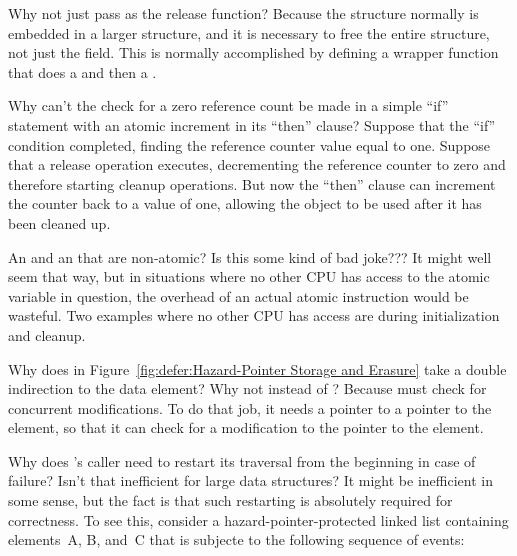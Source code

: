 \begin{enumerate}
\QuickQ{}
	Why not just pass  as the release function?
\QuickA{}
	Because the  structure normally is embedded in
	a larger structure, and it is necessary to free the entire
	structure, not just the  field.
	This is normally accomplished by defining a wrapper function
	that does a  and then a .

\QuickQ{}
	Why can't the check for a zero reference count be
	made in a simple ``if'' statement with an atomic
	increment in its ``then'' clause?
\QuickA{}
	Suppose that the ``if'' condition completed, finding
	the reference counter value equal to one.
	Suppose that a release operation executes, decrementing
	the reference counter to zero and therefore starting
	cleanup operations.
	But now the ``then'' clause can increment the counter
	back to a value of one, allowing the object to be
	used after it has been cleaned up.

\QuickQ{}
	An  and an  that are
	non-atomic?
	Is this some kind of bad joke???
\QuickA{}
	It might well seem that way, but in situations where no other
	CPU has access to the atomic variable in question, the overhead
	of an actual atomic instruction would be wasteful.
	Two examples where no other CPU has access are
	during initialization and cleanup.

\QuickQ{}
	Why does  in
	Figure~\ref{fig:defer:Hazard-Pointer Storage and Erasure}
	take a double indirection to the data element?
	Why not  instead of ?
\QuickA{}
	Because  must check for concurrent modifications.
	To do that job, it needs a pointer to a pointer to the element,
	so that it can check for a modification to the pointer to the
	element.

\QuickQ{}
	Why does 's caller need to restart its
	traversal from the beginning in case of failure?
	Isn't that inefficient for large data structures?
\QuickA{}
	It might be inefficient in some sense, but the fact is that
	such restarting is absolutely required for correctness.
	To see this, consider a hazard-pointer-protected linked list
	containing elements~A, B, and~C that is subjecte to the
	following sequence of events:


\end{enumerate}
